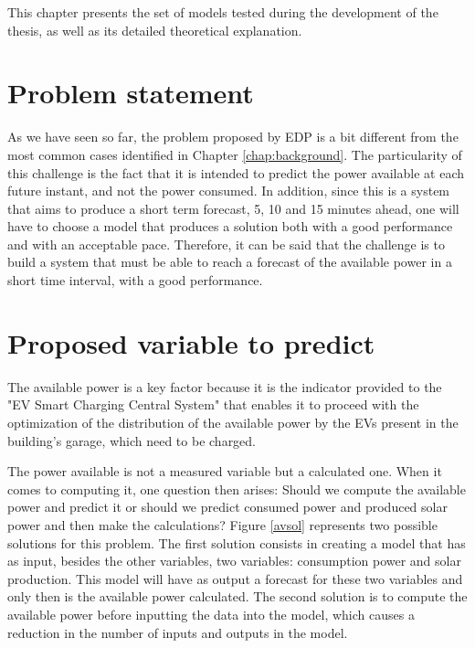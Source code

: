 \cleardoublepage
\label{chap:Model}

This chapter presents the set of models tested during the development of the thesis, as well as its detailed theoretical explanation.

\section{Problem statement} \label{chap4:ps}

As we have seen so far, the problem proposed by \ac{EDP} is a bit different from the most common cases identified in Chapter \ref{chap:background}. The particularity of this challenge is the fact that it is intended to predict the power available at each future instant, and not the power consumed. In addition, since this is a system that aims to produce a short term forecast, 5, 10 and 15 minutes ahead, one will have to choose a model that produces a solution both with a good performance and with an acceptable pace. Therefore, it can be said that the challenge is to build a system that must be able to reach a forecast of the available power in a short time interval, with a good performance.


\section{Proposed variable to predict}\label{chap4:vtp}

The available power is a key factor because it is the indicator provided to the "\ac{EV} Smart Charging Central System" that enables it to proceed with the optimization of the distribution of the available power by the \ac{EV}s present in the building's garage, which need to be charged.

The power available is not a measured variable but a calculated one. When it comes to computing it, one question then arises: Should we compute the available power and predict it or should we predict consumed power and produced solar power and  then make the calculations? Figure \ref{avsol} represents two possible solutions for this problem. The first solution consists in creating a model that has as input, besides the other variables, two variables: consumption power and solar production. This model will have as output a forecast for these two variables and only then is the available power calculated. The second solution is to compute the available power before inputting the data into the model, which causes a reduction in the number of inputs and outputs in the model. 

